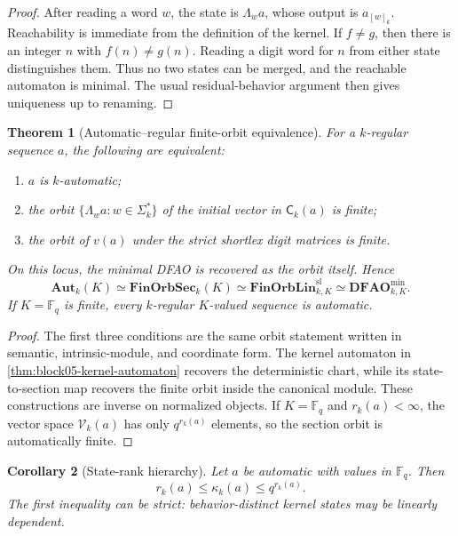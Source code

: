 \documentclass[11pt]{article}
\newtheorem{theorem}{Theorem}[section]
\newtheorem{corollary}[theorem]{Corollary}
\theoremstyle{definition}
\theoremstyle{remark}
\begin{document}
\begin{proof}
After reading a word \(w\), the state is \(\Lambda_wa\), whose output is \(a_{[w]_k}\).  Reachability is immediate from the definition of the kernel.  If \(f\neq g\), then there is an integer \(n\) with \(f(n)\neq g(n)\).  Reading a digit word for \(n\) from either state distinguishes them.  Thus no two states can be merged, and the reachable automaton is minimal.  The usual residual-behavior argument then gives uniqueness up to renaming.
\end{proof}

\begin{theorem}[Automatic--regular finite-orbit equivalence]
\label{thm:block05-automatic-regular-equivalence}
For a \(k\)-regular sequence \(a\), the following are equivalent:
\begin{enumerate}
\item \(a\) is \(k\)-automatic;
\item the orbit \(\{\Lambda_wa:w\in\Sigma_k^*\}\) of the initial vector in \(\mathsf C_k(a)\) is finite;
\item the orbit of \(v(a)\) under the strict shortlex digit matrices is finite.
\end{enumerate}
On this locus, the minimal DFAO is recovered as the orbit itself.  Hence
\begin{equation}
\mathbf{Aut}_k(K)
\simeq
\mathbf{FinOrbSec}_k(K)
\simeq
\mathbf{FinOrbLin}_{k,K}^{\mathrm{sl}}
\simeq
\mathbf{DFAO}_{k,K}^{\min}.
\label{eq:block05-automatic-finite-orbit-atlas}
\end{equation}
If \(K=\mathbb F_q\) is finite, every \(k\)-regular \(K\)-valued sequence is automatic.
\end{theorem}

\begin{proof}
The first three conditions are the same orbit statement written in semantic, intrinsic-module, and coordinate form.  The kernel automaton in \cref{thm:block05-kernel-automaton} recovers the deterministic chart, while its state-to-section map recovers the finite orbit inside the canonical module.  These constructions are inverse on normalized objects.  If \(K=\mathbb F_q\) and \(r_k(a)<\infty\), the vector space \(\mathcal V_k(a)\) has only \(q^{r_k(a)}\) elements, so the section orbit is automatically finite.
\end{proof}

\begin{corollary}[State-rank hierarchy]
\label{cor:block05-state-rank}
Let \(a\) be automatic with values in \(\mathbb F_q\).  Then
\begin{equation}
\boxed{
 r_k(a)
 \leq
 \kappa_k(a)
 \leq
 q^{r_k(a)}.
}
\label{eq:block05-state-rank-bound}
\end{equation}
The first inequality can be strict: behavior-distinct kernel states may be linearly dependent.
\end{corollary}
\end{document}
